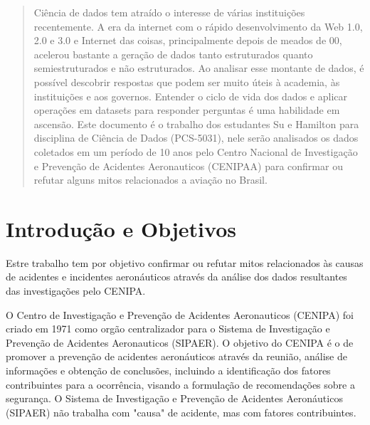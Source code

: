 \documentclass[conference]{IEEEtran}
\begin{document}




\maketitle

\begin{abstract}
Ciência de dados tem atraído o interesse de várias instituições recentemente. A era da internet com o rápido desenvolvimento da Web 1.0, 2.0 e 3.0 e Internet das coisas,
principalmente depois de meados de 00, acelerou bastante a geração de dados tanto estruturados quanto semiestruturados e não estruturados. Ao analisar esse montante de 
dados, é possível descobrir respostas que podem ser muito úteis à academia, às instituições e aos governos. Entender o ciclo de vida dos dados e aplicar operações em 
datasets para responder perguntas é uma habilidade em ascensão. Este documento é o trabalho dos estudantes Su e Hamilton para disciplina de Ciência de Dados (PCS-5031), 
nele serão analisados os dados coletados em um período de 10 anos pelo Centro Nacional de Investigação e Prevenção de Acidentes Aeronauticos (CENIPAA) para confirmar ou
refutar alguns mitos relacionados a aviação no Brasil.
\end{abstract}





%
\IEEEpeerreviewmaketitle

\section{Introdução e Objetivos}

Estre trabalho tem por objetivo confirmar ou refutar mitos relacionados às causas de acidentes e incidentes aeronáuticos através da análise dos dados resultantes das 
investigações pelo CENIPA.

O Centro de Investigação e Prevenção de Acidentes Aeronauticos (CENIPA) foi criado em 1971 como orgão centralizador para o Sistema de Investigação e Prevenção de
Acidentes Aeronauticos (SIPAER). O objetivo do CENIPA é o de promover a prevenção de acidentes aeronáuticos através da reunião, análise de informações e obtenção 
de conclusões, incluindo a identificação dos fatores contribuintes para a ocorrência, visando a formulação de recomendações sobre a segurança. O Sistema de Investigação
e Prevenção de Acidentes Aeronáuticos (SIPAER) não trabalha com "causa" de acidente, mas com fatores contribuintes.
\end{document}
